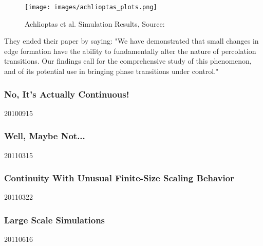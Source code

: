 \begin{figure}[H]
	\centering
	\texttt{[image: images/achlioptas\_plots.png]}
	\caption{Achlioptas et al. Simulation Results, Source: \cite{Achlioptas_1}}
	\label{fig:achlioptas_plots}
\end{figure}

They ended their paper by saying: "We have demonstrated that small changes in edge formation have the ability to fundamentally alter the nature of percolation transitions. Our findings call for the comprehensive study of this phenomenon, and of its potential use in bringing phase transitions under control." \cite{Achlioptas_1}



\subsubsection{No, It's Actually Continuous!}
20100915



\subsubsection{Well, Maybe Not...}
20110315



\subsubsection{Continuity With Unusual Finite-Size Scaling Behavior}
20110322



\subsubsection{Large Scale Simulations}
20110616



